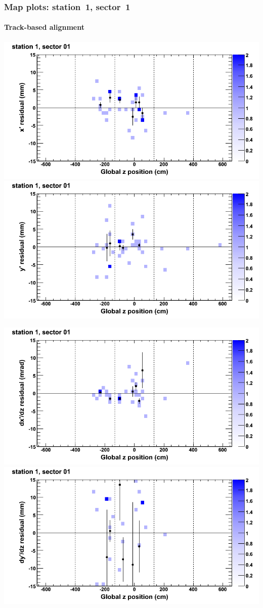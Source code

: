 \documentclass[compress]{beamer}
\begin{document}
\begin{frame}
\frametitle{Map plots: station~1, sector~1}
\framesubtitle{Track-based alignment}
\includegraphics[width=0.5\linewidth]{mapplots_re05/DTvsz_st1sec01_x.png}
\includegraphics[width=0.5\linewidth]{mapplots_re05/DTvsz_st1sec01_y.png}

\includegraphics[width=0.5\linewidth]{mapplots_re05/DTvsz_st1sec01_dxdz.png}
\includegraphics[width=0.5\linewidth]{mapplots_re05/DTvsz_st1sec01_dydz.png}
\end{frame}
\end{document}
